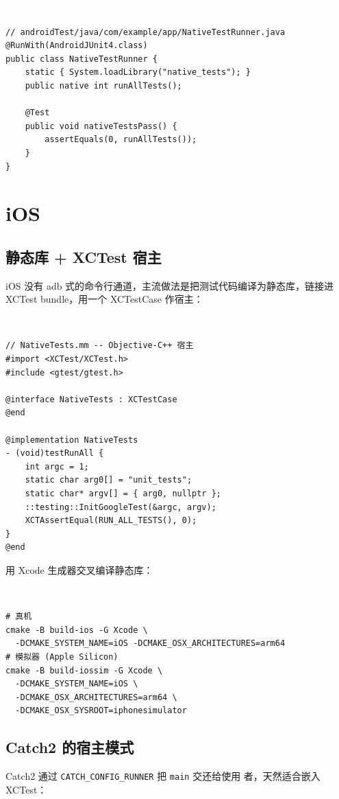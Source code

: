 \documentclass[12pt,a4paper,fontset=fandol]{ctexbook}
\newcommand{\javalabel}{%
  \begin{tcolorbox}[enhanced,colback=javaheadbg,colframe=javaheadbg,
    arc=1mm,boxrule=0mm,left=6pt,right=6pt,top=2pt,bottom=2pt,
    halign=left,oversize]
    \textcolor{white}{\small\bfseries Java}
  \end{tcolorbox}\vspace{-4pt}}
\newcommand{\objclabel}{%
  \begin{tcolorbox}[enhanced,colback=objcheadbg,colframe=objcheadbg,
    arc=1mm,boxrule=0mm,left=6pt,right=6pt,top=2pt,bottom=2pt,
    halign=left,oversize]
    \textcolor{white}{\small\bfseries Objective-C++}
  \end{tcolorbox}\vspace{-4pt}}
\newcommand{\bashlabel}{%
  \begin{tcolorbox}[enhanced,colback=black!80,colframe=black!80,
    arc=1mm,boxrule=0mm,left=6pt,right=6pt,top=2pt,bottom=2pt,
    halign=left,oversize]
    \textcolor{white}{\small\bfseries Shell}
  \end{tcolorbox}\vspace{-4pt}}
\begin{document}
\javalabel
\begin{lstlisting}
// androidTest/java/com/example/app/NativeTestRunner.java
@RunWith(AndroidJUnit4.class)
public class NativeTestRunner {
    static { System.loadLibrary("native_tests"); }
    public native int runAllTests();

    @Test
    public void nativeTestsPass() {
        assertEquals(0, runAllTests());
    }
}
\end{lstlisting}

\section{iOS}

\subsection{静态库 + XCTest 宿主}

iOS 没有 adb 式的命令行通道，主流做法是把测试代码编译为静态库，链接进
XCTest bundle，用一个 XCTestCase 作宿主：

\objclabel
\begin{lstlisting}
// NativeTests.mm -- Objective-C++ 宿主
#import <XCTest/XCTest.h>
#include <gtest/gtest.h>

@interface NativeTests : XCTestCase
@end

@implementation NativeTests
- (void)testRunAll {
    int argc = 1;
    static char arg0[] = "unit_tests";
    static char* argv[] = { arg0, nullptr };
    ::testing::InitGoogleTest(&argc, argv);
    XCTAssertEqual(RUN_ALL_TESTS(), 0);
}
@end
\end{lstlisting}

用 Xcode 生成器交叉编译静态库：

\bashlabel
\begin{lstlisting}
# 真机
cmake -B build-ios -G Xcode \
  -DCMAKE_SYSTEM_NAME=iOS -DCMAKE_OSX_ARCHITECTURES=arm64
# 模拟器 (Apple Silicon)
cmake -B build-iossim -G Xcode \
  -DCMAKE_SYSTEM_NAME=iOS \
  -DCMAKE_OSX_ARCHITECTURES=arm64 \
  -DCMAKE_OSX_SYSROOT=iphonesimulator
\end{lstlisting}

\subsection{Catch2 的宿主模式}

Catch2 通过 \texttt{CATCH\_CONFIG\_RUNNER} 把 \texttt{main} 交还给使用
者，天然适合嵌入 XCTest：
\end{document}
